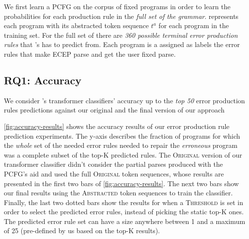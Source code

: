 We first learn a PCFG on the corpus of fixed programs in order to learn the
probabilities for each production rule in the \emph{full set of the \python
grammar}. \toolname represents each program with its abstracted token sequence
$t^a$ for each program in the training set. For the full set of \python there
are \emph{360 possible terminal error production rules} that \toolname's has to
predict from. Each program is a assigned as labels the error rules that make
ECEP parse and get the user fixed parse.


\subsection{RQ1: Accuracy}
\label{sec:eval:accuracy}

We consider \toolname's transformer classifiers' accuracy up to the \emph{top
50} error production rules predictions against our original and the final
version of our approach



%
\autoref{fig:accuracy-results} shows the accuracy results of our error
production rule prediction experiments. The y-axis describes the fraction of
programs for which the \emph{whole} set of the needed error rules needed to
repair the \emph{erroneous} program was a complete subset of the top-K predicted
rules.
%
The \textsc{Original} version of our transformer classifier didn't consider the
partial parses produced with the PCFG's aid and used the full \textsc{Original}
token sequences, whose results are presented in the first two bars of
\autoref{fig:accuracy-results}. The next two bars show our final results using
the \textsc{Abstracted} token sequences to train the classifier. Finally, the
last two dotted bars show the results for when a \textsc{Threshold} is set in
order to select the predicted error rules, instead of picking the static top-K
ones. The predicted error rule set can have a size anywhere between 1 and a
maximum of 25 (pre-defined by us based on the top-K results).

